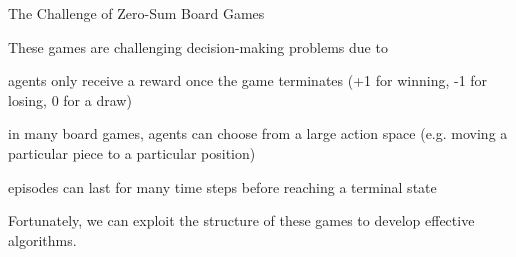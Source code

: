 \begin{frame}[t]{The Challenge of Zero-Sum Board Games}
    \pause

     These games are challenging decision-making problems due to
    \blist
        \item<2->  agents only receive a reward once the game terminates (+1 for winning, -1 for losing, 0 for a draw)
        \item<3->  in many board games, agents can choose from a large action space (e.g. moving a particular piece to a particular position)
        \item<4->  episodes can last for many time steps before reaching a terminal state
    \elist

    \pause
    \pause
    \pause
    \pause

    Fortunately, we can exploit the structure of these games to develop effective algorithms.
\end{frame}

